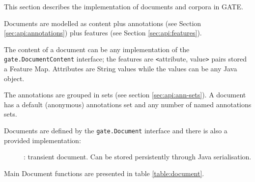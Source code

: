 
This section describes the
implementation of documents and corpora in GATE.


Documents are modelled as content plus annotations (see Section
\ref{sec:api:annotations}) plus features (see Section
\ref{sec:api:features}).

The content of a document can be any implementation of the \linebreak\ {\tt
gate.DocumentContent} interface; the features are \verb!<!attribute,
value\verb!>! pairs stored a Feature Map. Attributes are String values while
the values can be any Java object.

The annotations are grouped in sets (see section \ref{sec:api:ann-sets}). A
document has a default (anonymous) annotations set and any number of named
annotations sets.

Documents are defined by the {\tt gate.Document} interface and there is also a
provided implementation:
\begin{description}
\item[{\tt {}}]: transient document. Can be stored
persistently through Java serialisation.
%
\end{description}

Main Document functions are presented in table \ref{table:document}.

